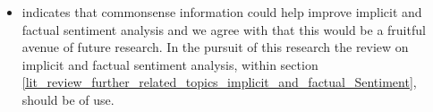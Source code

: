\begin{itemize}
    \item \citet{poria2020beneath} indicates that commonsense information could help improve implicit and factual sentiment analysis and we agree with \citet{poria2020beneath} that this would be a fruitful avenue of future research. In the pursuit of this research the review on implicit and factual sentiment analysis, within section \ref{lit_review_further_related_topics_implicit_and_factual_Sentiment}, should be of use. %
\end{itemize}

\label{section:conclusion_future_work}